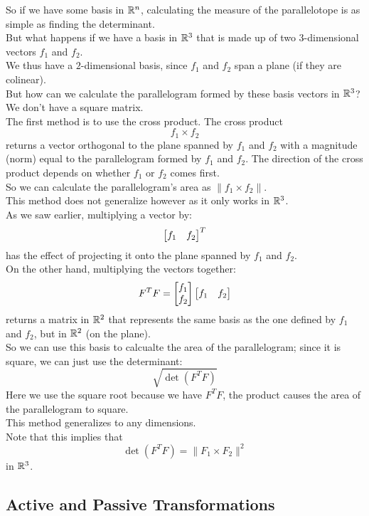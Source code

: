 \documentclass[12pt]{article}
\begin{document}
So if we have some basis in $\mathbb{R}^n$,
calculating the measure of the
parallelotope is as simple as finding the
determinant. \\

But what happens if we have a basis in $\mathbb{R}^3$
that is made up of two $3$-dimensional vectors $f_1$
and $f_2$. \\
We thus have a $2$-dimensional basis,
since $f_1$ and $f_2$ span a plane
(if they are colinear). \\
But how can we calculate the parallelogram
formed by these basis vectors in $\mathbb{R}^3$?
We don't have a square matrix. \\

The first method is to use the cross product.
The cross product
\[ f_1 \times f_2 \]
returns a vector orthogonal to the plane
spanned by $f_1$ and $f_2$
with a magnitude (norm) equal to
the parallelogram formed by $f_1$ and $f_2$.
The direction of the cross product
depends on whether $f_1$ or $f_2$
comes first. \\
So we can calculate the parallelogram's
area as $\|f_1 \times f_2\|$. \\

This method does not generalize however
as it only works in $\mathbb{R}^3$. \\
As we saw earlier,
multiplying a vector by:
\[ \begin{bmatrix} f_1 & f_2 \end{bmatrix}^T \]
has the effect of projecting it
onto the plane spanned by $f_1$ and $f_2$. \\
On the other hand,
multiplying the vectors together:
\[ F^TF = \begin{bmatrix} f_1 \\ f_2 \end{bmatrix}
\begin{bmatrix} f_1 & f_2 \end{bmatrix} \]
returns a matrix in $\mathbb{R}^2$
that represents the same basis
as the one defined by $f_1$ and $f_2$,
but in $\mathbb{R}^2$ (on the plane). \\
So we can use this basis to calcualte
the area of the parallelogram;
since it is square,
we can just use the determinant:
\[ \sqrt{\det(F^TF)} \]
Here we use the square root because we have
$F^TF$,
the product causes the area of the parallelogram
to square. \\
This method generalizes to any dimensions. \\

Note that this implies that
\[ \det(F^TF) = \|F_1 \times F_2\|^2 \]
in $\mathbb{R}^3$. \\

\newpage

\subsection*{Active and Passive Transformations}
\end{document}
